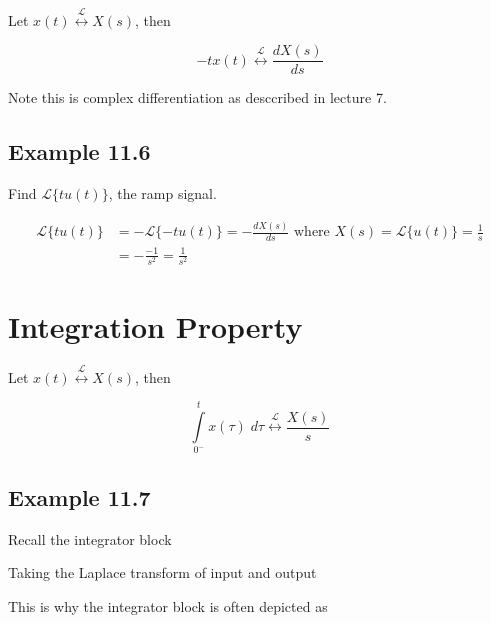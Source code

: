 \documentclass{article}
\begin{document}
Let $x(t) \stackrel{\mathcal{L}}{\longleftrightarrow} X(s)$, then 


$$
-t x(t) \stackrel{\mathcal{L}}{\longleftrightarrow} \frac{d X(s)}{d s}
$$

Note this is complex differentiation as desccribed in lecture 7.

\subsection{Example 11.6}

Find $\mathcal{L}\{t u(t)\}$, the ramp signal.

$$
\begin{aligned}
\mathcal{L}\{t u(t)\} & =-\mathcal{L}\{-t u(t)\}=-\frac{d X(s)}{d s} \text { where } X(s) =\mathcal{L}\{u(t)\} =\frac{1}{s}\\
& =-\frac{-1}{s^{2}}=\frac{1}{s^{2}}
\end{aligned}
$$

\section{Integration Property}

Let $x(t) \stackrel{\mathcal{L}}{\longleftrightarrow} X(s)$, then 

$$
\int\limits_{0^-}^t  x(\tau) \; d\tau \stackrel{\mathcal{L}}{\longleftrightarrow} \frac{X(s)}{s}
$$

\subsection{Example 11.7}

Recall the integrator block

Taking the Laplace transform of input and output


This is why the integrator block is often depicted as
\end{document}
